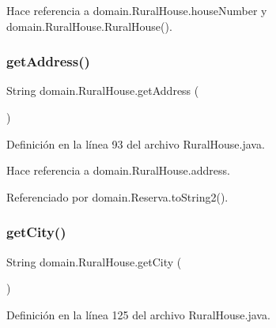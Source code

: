 Hace referencia a domain.\+Rural\+House.\+house\+Number y domain.\+Rural\+House.\+Rural\+House().

\mbox{\label{classdomain_1_1_rural_house_a970dabd2796ee789c4feb2cef8fe2df3}} 
\subsubsection{\texorpdfstring{getAddress()}{getAddress()}}
{\footnotesize\ttfamily String domain.\+Rural\+House.\+get\+Address (\begin{DoxyParamCaption}{ }\end{DoxyParamCaption})}



Definición en la línea 93 del archivo Rural\+House.\+java.


\begin{DoxyCode}{0}

\end{DoxyCode}


Hace referencia a domain.\+Rural\+House.\+address.



Referenciado por domain.\+Reserva.\+to\+String2().

\mbox{\label{classdomain_1_1_rural_house_a67a45aa0b441b32d455d58c4a42446f1}} 
\subsubsection{\texorpdfstring{getCity()}{getCity()}}
{\footnotesize\ttfamily String domain.\+Rural\+House.\+get\+City (\begin{DoxyParamCaption}{ }\end{DoxyParamCaption})}



Definición en la línea 125 del archivo Rural\+House.\+java.


\begin{DoxyCode}{0}

\end{DoxyCode}


